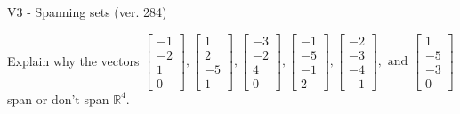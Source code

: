 \begin{exercise}
  \begin{exerciseTitle}V3 - Spanning sets (ver. 284)\end{exerciseTitle}
  \begin{exerciseStatement}
    Explain why the vectors \(\left[\begin{array}{r}
-1 \\
-2 \\
1 \\
0
\end{array}\right] , \left[\begin{array}{r}
1 \\
2 \\
-5 \\
1
\end{array}\right] , \left[\begin{array}{r}
-3 \\
-2 \\
4 \\
0
\end{array}\right] , \left[\begin{array}{r}
-1 \\
-5 \\
-1 \\
2
\end{array}\right] , \left[\begin{array}{r}
-2 \\
-3 \\
-4 \\
-1
\end{array}\right] , \text{ and } \left[\begin{array}{r}
1 \\
-5 \\
-3 \\
0
\end{array}\right]\) span or don't span \(\mathbb{R}^4\). 
	



\end{exerciseStatement}
\end{exercise}
